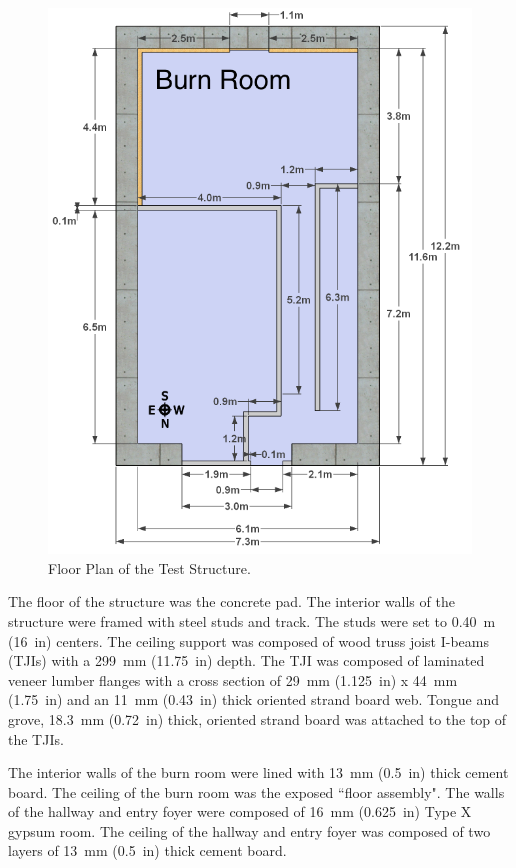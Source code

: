 \documentclass[12pt,oneside]{book}
\begin{document}
\begin{figure}[!ht]
	\includegraphics[width=6in]{../Figures/Pictures/DelCoSingleStoryDimensionsMetric}
	\caption{Floor Plan of the Test Structure.}
	\label{fig:Test_Structure_Floor_Plan}
\end{figure}

The floor of the structure was the concrete pad. The interior walls of the structure were framed with steel studs and track.  The studs were set to 0.40~m (16~in) centers. The ceiling support was composed of wood truss joist I-beams (TJIs) with a 299~mm (11.75~in) depth. The TJI was composed of laminated veneer lumber flanges with a cross section of 29~mm (1.125~in) x 44~mm (1.75~in) and an 11~mm (0.43~in) thick oriented strand board web. Tongue and grove, 18.3~mm (0.72~in) thick, oriented strand board was attached to the top of the TJIs.

The interior walls of the burn room were lined with 13~mm (0.5~in) thick cement board. The ceiling of the burn room was the exposed ``floor assembly". The walls of the hallway and entry foyer were composed of 16~mm (0.625~in) Type X gypsum room. The ceiling of the hallway and entry foyer was composed of two layers of 13~mm (0.5~in) thick cement board.
\end{document}
